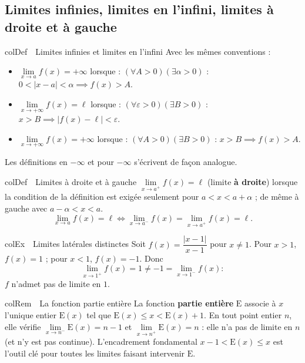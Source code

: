 \documentclass[11pt,a4paper]{article}
\newenvironment{definition}[1][Définition]
  {\begin{fiche}{colDef}{\ding{110}~~#1}}{\end{fiche}}
\newenvironment{exemple}[1][Exemple]
  {\begin{fiche}{colEx}{\ding{217}~~#1}}{\end{fiche}}
\newenvironment{remarque}[1][Remarque]
  {\begin{fiche}{colRem}{\ding{43}~~#1}}{\end{fiche}}
\newcommand{\E}{\mathrm{E}}
\begin{document}
\subsection{Limites infinies, limites en l'infini, limites à droite et à gauche}

\begin{definition}[Limites infinies et limites en l'infini]
Avec les mêmes conventions :
\begin{itemize}[leftmargin=6mm, itemsep=0.5mm]
  \item $\lim\limits_{x \to a} f(x) = +\infty$ lorsque : $(\forall A > 0)(\exists \alpha > 0)$ : $0 < |x - a| < \alpha \implies f(x) > A$.
  \item $\lim\limits_{x \to +\infty} f(x) = \ell$ lorsque : $(\forall \varepsilon > 0)(\exists B > 0)$ : $x > B \implies |f(x) - \ell| < \varepsilon$.
  \item $\lim\limits_{x \to +\infty} f(x) = +\infty$ lorsque : $(\forall A > 0)(\exists B > 0)$ : $x > B \implies f(x) > A$.
\end{itemize}
Les définitions en $-\infty$ et pour $-\infty$ s'écrivent de façon analogue.
\end{definition}

\begin{definition}[Limites à droite et à gauche]
$\lim\limits_{x \to a^+} f(x) = \ell$ (limite \textbf{à droite}) lorsque la condition de la définition est exigée seulement pour $a < x < a + \alpha$ ; de même à gauche avec $a - \alpha < x < a$.
\[
  \lim_{x \to a} f(x) = \ell
  \iff
  \lim_{x \to a^-} f(x) = \lim_{x \to a^+} f(x) = \ell.
\]
\end{definition}

\begin{exemple}[Limites latérales distinctes]
Soit $f(x) = \dfrac{|x - 1|}{x - 1}$ pour $x \neq 1$. Pour $x > 1$, $f(x) = 1$ ; pour $x < 1$, $f(x) = -1$. Donc
\[
  \lim_{x \to 1^+} f(x) = 1 \neq -1 = \lim_{x \to 1^-} f(x) :
\]
$f$ n'admet pas de limite en $1$.
\end{exemple}

\begin{remarque}[La fonction partie entière]
La fonction \textbf{partie entière} $\E$ associe à $x$ l'unique entier $\E(x)$ tel que $\E(x) \leq x < \E(x) + 1$. En tout point entier $n$, elle vérifie $\lim\limits_{x \to n^-} \E(x) = n - 1$ et $\lim\limits_{x \to n^+} \E(x) = n$ : elle n'a pas de limite en $n$ (et n'y est pas continue). L'encadrement fondamental $x - 1 < \E(x) \leq x$ est l'outil clé pour toutes les limites faisant intervenir $\E$.
\end{remarque}
\end{document}
